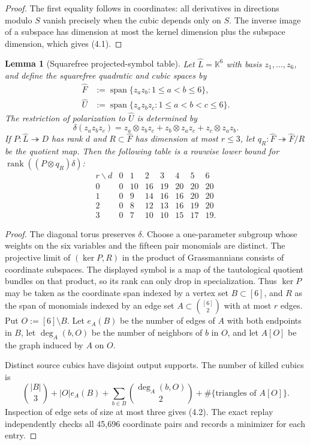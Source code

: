 \documentclass[11pt]{amsart}
\newcommand{\K}{\mathbb{K}}
\newcommand{\Span}{\operatorname{span}}
\newcommand{\rank}{\operatorname{rank}}
\newtheorem{lemma}[theorem]{Lemma}
\theoremstyle{definition}
\begin{document}
\begin{proof}
The first equality follows in coordinates: all derivatives in directions
modulo \(S\) vanish precisely when the cubic depends only on \(S\). The
inverse image of a subspace has dimension at most the kernel dimension plus
the subspace dimension, which gives (4.1).
\end{proof}

\begin{lemma}[Squarefree projected-symbol table]\label{lem:squarefree}
Let \(\widehat L=\K^6\) with basis \(z_1,\ldots,z_6\), and define the
squarefree quadratic and cubic spaces by
\[
 \begin{aligned}
 \widehat F&:=\Span\{z_az_b:1\le a<b\le6\},\\
 \widehat U&:=\Span\{z_az_bz_c:1\le a<b<c\le6\}.
 \end{aligned}
\]
The restriction of polarization to \(\widehat U\) is determined by
\[
 \delta(z_az_bz_c)=z_a\otimes z_bz_c+z_b\otimes z_az_c
                    +z_c\otimes z_az_b.
\]
If \(P:\widehat L\twoheadrightarrow D\) has rank \(d\) and
\(R\subset\widehat F\) has dimension at most \(r\le3\), let
\(q_R:\widehat F\twoheadrightarrow\widehat F/R\) be the quotient map. Then the following
table is a rowwise lower bound for
\(\rank((P\otimes q_R)\delta)\):
\[
\begin{array}{c|rrrrrrr}
r\backslash d&0&1&2&3&4&5&6\\ \hline
0&0&10&16&19&20&20&20\\
1&0&9&14&16&16&20&20\\
2&0&8&12&13&16&19&20\\
3&0&7&10&10&15&17&19.
\end{array} \tag{4.2}
\]
\end{lemma}

\begin{proof}
The diagonal torus preserves \(\delta\). Choose a one-parameter subgroup
whose weights on the six variables and the fifteen pair monomials are
distinct. The projective limit of \((\ker P,R)\) in the product of
Grassmannians consists of coordinate subspaces. The displayed symbol is
a map of the tautological quotient bundles on that product, so its rank
can only drop in specialization. Thus \(\ker P\) may be
taken as the coordinate span indexed by a vertex set \(B\subset[6]\), and
\(R\) as the span of monomials indexed by an edge set
\(A\subset\binom{[6]}2\) with at most \(r\) edges. Put
\(O:=[6]\setminus B\). Let \(e_A(B)\) be the number of edges of \(A\) with
both endpoints in \(B\), let \(\deg_A(b,O)\) be the number of neighbors of
\(b\) in \(O\), and let \(A[O]\) be the graph induced by \(A\) on \(O\).

Distinct source cubics have disjoint output supports. The number of killed
cubics is
\[
 \binom{|B|}{3}+|O|e_A(B)
 +\sum_{b\in B}\binom{\deg_A(b,O)}2
 +\#\{\text{triangles of }A[O]\}. \tag{4.3}
\]
Inspection of edge sets of size at most three gives (4.2). The exact replay
independently checks all 45,696 coordinate pairs and records a minimizer for
each entry.
\end{proof}
\end{document}
